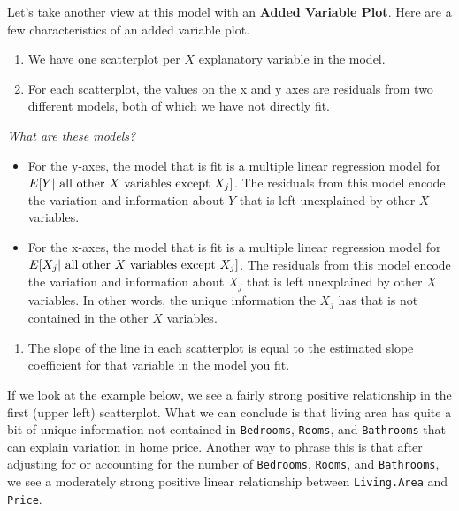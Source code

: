 \documentclass[
]{book}
\providecommand{\tightlist}{%
  \setlength{\itemsep}{0pt}\setlength{\parskip}{0pt}}
\begin{document}
Let's take another view at this model with an \textbf{Added Variable Plot}. Here are a few characteristics of an added variable plot.

\begin{enumerate}
\def\labelenumi{\arabic{enumi}.}
\tightlist
\item
  We have one scatterplot per \(X\) explanatory variable in the model.
\item
  For each scatterplot, the values on the x and y axes are residuals from two different models, both of which we have not directly fit.
\end{enumerate}

\emph{What are these models?}

\begin{itemize}
\tightlist
\item
  For the y-axes, the model that is fit is a multiple linear regression model for \(E[Y |\hbox{ all other }X\hbox{ variables except }X_j]\). The residuals from this model encode the variation and information about \(Y\) that is left unexplained by other \(X\) variables.
\item
  For the x-axes, the model that is fit is a multiple linear regression model for \(E[X_j | \hbox{ all other }X\hbox{ variables except }X_j]\). The residuals from this model encode the variation and information about \(X_j\) that is left unexplained by other \(X\) variables. In other words, the unique information the \(X_j\) has that is not contained in the other \(X\) variables.
\end{itemize}

\begin{enumerate}
\def\labelenumi{\arabic{enumi}.}
\setcounter{enumi}{2}
\tightlist
\item
  The slope of the line in each scatterplot is equal to the estimated slope coefficient for that variable in the model you fit.
\end{enumerate}

If we look at the example below, we see a fairly strong positive relationship in the first (upper left) scatterplot. What we can conclude is that living area has quite a bit of unique information not contained in \texttt{Bedrooms}, \texttt{Rooms}, and \texttt{Bathrooms} that can explain variation in home price. Another way to phrase this is that after adjusting for or accounting for the number of \texttt{Bedrooms}, \texttt{Rooms}, and \texttt{Bathrooms}, we see a moderately strong positive linear relationship between \texttt{Living.Area} and \texttt{Price}.
\end{document}
